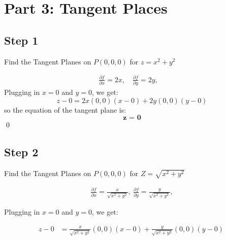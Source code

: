 \documentclass[english]{article}
\begin{document}
\section{Part 3: Tangent Places}
\begin{center}
\end{center}

\subsection{Step 1}

Find the Tangent Planes on $P(0,0,0)$ for $z = x^2 + y^2$

\begin{align*}
    \frac{\partial f}{\partial x} = 2x, \quad
    \frac{\partial f}{\partial y} = 2y, \quad 
\end{align*}
\noindent Plugging in $x=0$ and $y=0$, we get:
$$ z - 0 = 2x (0,0)(x-0) + 2y (0,0)(y-0) $$
\noindent so the equation of the tangent plane is:
$$ \textbf{z = 0}$$
\qed

\subsection{Step 2}

Find the Tangent Planes on $P(0,0,0)$ for $Z = \sqrt{x^2 + y^2}$

\begin{align*}
    \frac{\partial f}{\partial x} = \frac{x}{\sqrt{x^2 + y^2}}, \
    \frac{\partial f}{\partial y} = \frac{y}{\sqrt{x^2 + y^2}},
\end{align*}

\noindent Plugging in $x=0$ and $y=0$, we get:

\begin{align*}
    z - 0 &= \frac{x}{\sqrt{x^2 + y^2}}(0,0)(x-0) + \frac{y}{\sqrt{x^2 + y^2}} (0,0)(y-0)\
\end{align*}
\end{document}
